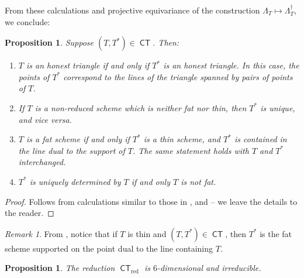 \documentclass[reqno, 11pt]{amsart}
\theoremstyle{plain}
\newtheorem{proposition}[theorem]{Proposition}
\theoremstyle{remark}
\newtheorem{remark}[theorem]{Remark}
\DeclareMathOperator{\CT}{\mathsf{CT}}
\DeclareMathOperator{\red}{red}
\begin{document}
From these calculations and projective equivariance of the
construction $\Lambda_{T} \mapsto \Lambda_{T}^{\dagger}$, we conclude:
\begin{proposition}
  \label{proposition:fatandtriple}
  Suppose $(T, T^{*}) \in \CT$. Then:
  \begin{enumerate} 
  \item $T$ is an honest triangle if and only
    if $T^{*}$ is an honest triangle. In this case, the points of
    $T^{*}$ correspond to the lines of the triangle spanned by pairs of points of $T$.

  \item If $T$ is a non-reduced scheme which is neither fat nor thin,
    then $T^{*}$ is unique, and vice versa.

  \item $T$ is a fat scheme if and only if $T^{*}$ is a thin scheme,
    and $T^{*}$ is contained in the line dual to the support of
    $T$. The same statement holds with $T$ and $T^{*}$ interchanged.

    \item $T^{*}$ is uniquely determined by $T$ if and only $T$ is not fat.
\end{enumerate}
\end{proposition}
\begin{proof}
  Follows from calculations similar to those in ,  and  -- we leave the details to the reader.
\end{proof}

\begin{remark}
  From , notice that if $T$ is thin
  and $(T, T^{*}) \in \CT$, then $T^{*}$ is the fat scheme supported
  on the point dual to the line containing $T$.
\end{remark}


\begin{proposition}\label{prop:irreducible}
  The reduction $\CT_{\red}$ is $6$-dimensional and irreducible.
\end{proposition} 
\end{document}
